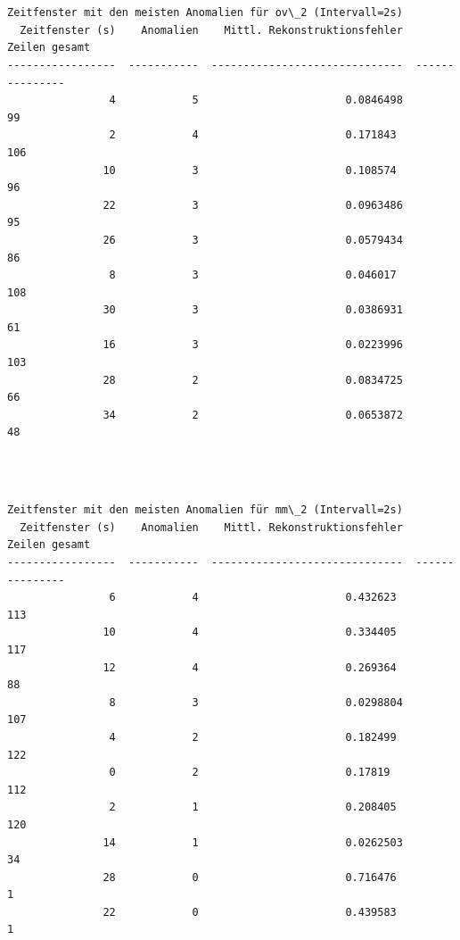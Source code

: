 \documentclass[11pt]{article}
\begin{document}
    \begin{center}
    \end{center}
    { \hspace*{\fill} \\}
    
    \begin{Verbatim}[commandchars=\\\{\}]

Zeitfenster mit den meisten Anomalien für ov\_2 (Intervall=2s)
  Zeitfenster (s)    Anomalien    Mittl. Rekonstruktionsfehler    Zeilen gesamt
-----------------  -----------  ------------------------------  ---------------
                4            5                       0.0846498               99
                2            4                       0.171843               106
               10            3                       0.108574                96
               22            3                       0.0963486               95
               26            3                       0.0579434               86
                8            3                       0.046017               108
               30            3                       0.0386931               61
               16            3                       0.0223996              103
               28            2                       0.0834725               66
               34            2                       0.0653872               48
    \end{Verbatim}

    \begin{center}
    \end{center}
    { \hspace*{\fill} \\}
    
    \begin{Verbatim}[commandchars=\\\{\}]

Zeitfenster mit den meisten Anomalien für mm\_2 (Intervall=2s)
  Zeitfenster (s)    Anomalien    Mittl. Rekonstruktionsfehler    Zeilen gesamt
-----------------  -----------  ------------------------------  ---------------
                6            4                       0.432623               113
               10            4                       0.334405               117
               12            4                       0.269364                88
                8            3                       0.0298804              107
                4            2                       0.182499               122
                0            2                       0.17819                112
                2            1                       0.208405               120
               14            1                       0.0262503               34
               28            0                       0.716476                 1
               22            0                       0.439583                 1
    \end{Verbatim}
\end{document}
